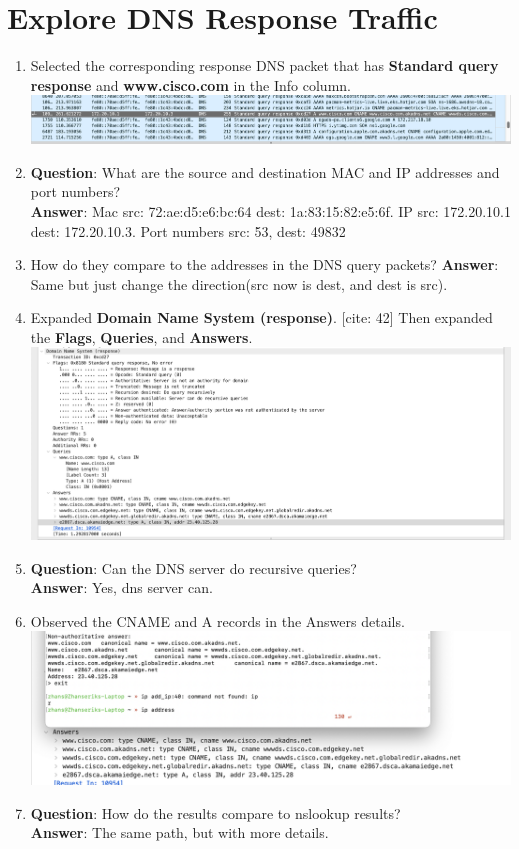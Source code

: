 \documentclass[12pt]{article}
\begin{document}
\section{Explore DNS Response Traffic}

\begin{enumerate}
    \item Selected the corresponding response DNS packet that has \textbf{Standard query response} and \textbf{www.cisco.com} in the Info column. \\ 
    \includegraphics[width=.7\textwidth]{Image17.png} 
    \item \textbf{Question}: What are the source and destination MAC and IP addresses and port numbers? \\
    \textbf{Answer}: Mac src: 72:ae:d5:e6:bc:64 dest: 1a:83:15:82:e5:6f. IP src: 172.20.10.1 dest: 172.20.10.3. Port numbers src: 53, dest: 49832 \\
    \item How do they compare to the addresses in the DNS query packets?
    \textbf{Answer}: Same but just change the direction(src now is dest, and dest is src). \\ 
    \item Expanded \textbf{Domain Name System (response)}. [cite: 42] Then expanded the \textbf{Flags}, \textbf{Queries}, and \textbf{Answers}. \\
    \includegraphics[width=.7\textwidth]{Image18.png} \\
    \item \textbf{Question}: Can the DNS server do recursive queries? \\ 
    \textbf{Answer}: Yes, dns server can. 
    \item Observed the CNAME and A records in the Answers details. \\
    \includegraphics[width=.7\textwidth]{Image19.png} \\
    \item \textbf{Question}: How do the results compare to nslookup results? \\
    \textbf{Answer}: The same path, but with more details.
\end{enumerate}
\end{document}
